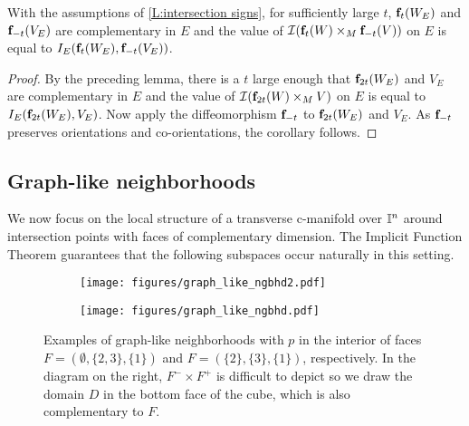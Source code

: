 \begin{corollary}\label{C:intersection signs}
	With the assumptions of \cref{L:intersection signs}, for sufficiently large $t$, $\mathbf{f}_t(W_E)$ and $\mathbf{f}_{-t}(V_E)$ are complementary in $E$ and the value of $\mathcal{I}(\mathbf{f}_t(W) \times_M \mathbf{f}_{-t}(V))$ on $E$ is equal to $I_E(\mathbf{f}_t(W_E), \mathbf{f}_{-t}(V_E))$.
\end{corollary}

\begin{proof}
	By the preceding lemma, there is a $t$ large enough that $\mathbf{f}_{2t}(W_E)$ and $V_E$ are complementary in $E$ and the value of $\mathcal{I}(\mathbf{f}_{2t}(W) \times_M V)$ on $E$ is equal to $I_E(\mathbf{f}_{2t}(W_E), V_E)$.
	Now apply the diffeomorphism $\mathbf{f}_{-t}$ to $\mathbf{f}_{2t}(W_E)$ and $V_E$.
	As $\mathbf{f}_{-t}$ preserves orientations and co-orientations, the corollary follows.
\end{proof}

\subsection{Graph-like neighborhoods}

We now focus on the local structure of a transverse c-manifold over $\mathbb{I}^n$ around intersection points with faces of complementary dimension.
The Implicit Function Theorem guarantees that the following subspaces occur naturally in this setting.

\begin{figure}[!h]
	\centering
	\begin{subfigure}{.32\textwidth}
		\texttt{[image: figures/graph\_like\_ngbhd2.pdf]}
		\hfill
	\end{subfigure}
	\begin{subfigure}{.32\textwidth}
		\vspace*{-14pt}
		\hfill
		\texttt{[image: figures/graph\_like\_ngbhd.pdf]}
	\end{subfigure}
	\caption{Examples of graph-like neighborhoods with $p$ in the interior of faces $F=(\emptyset, \{2,3\}, \{1\})$ and $F=(\{2\}, \{3\}, \{1\})$, respectively. In the diagram on the right, $F^-\times F^+$ is difficult to depict so we draw the domain $D$ in the bottom face of the cube, which is also complementary to $F$.}
	\label{F:graph like neighborhood}
\end{figure}


